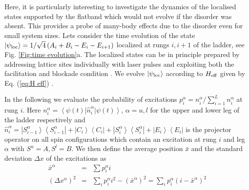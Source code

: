 \documentclass[prl,aps,twocolumn,showpacs,superscriptaddress,longbibliography]{revtex4-1}
\newcommand{\lan}{\left\langle}
\newcommand{\ran}{\right\rangle}
\newcommand{\ket}[1]{\left| #1 \ran}
\newcommand{\bra}[1]{\lan #1 \right|}
\begin{document}
Here, it is particularly interesting to investigate the dynamics of the localised states supported by the flatband which would not evolve if the disorder was absent. This provides a probe of many-body effects due to the disorder even for small system sizes. Lets consider the time evolution of the state $\ket{\psi_{\rm loc}} = 1/\sqrt{4} \left( A_i + B_i - E_i - E_{i+1} \right)$ localized at rungs $i,i+1$ of the ladder, see Fig. \ref{Fig:time evolution}a. The localized states can be in principle prepared by addressing lattice sites individually with laser pulses and exploiting both the facilitation and blockade condition \cite{SM}. We evolve $\ket{\psi_{\rm loc}}$ according to $H_{\rm eff}$ given by Eq. (\ref{eq:H eff}) \cite{SM}.


In the following we evaluate the probability of excitations $p^\alpha_i = n^\alpha_i/\sum_{i=1}^{L} n^\alpha_i$ at rung $i$. Here $n^\alpha_i = \bra{\psi(t)} \hat{n}^\alpha_i \ket{\psi(t)}$, $\alpha=u,l$ for the upper and lower leg of the ladder respectively and $\hat{n}^\alpha_i = \ket{S^\alpha_{i-1}}\bra{S^\alpha_{i-1}} + \ket{C_{i}}\bra{C_{i}} + \ket{S^\alpha_{i}}\bra{S^\alpha_{i}} + \ket{E_{i}}\bra{E_{i}}$ is the projector operator on all spin configurations which contain an excitation at rung $i$ and leg $\alpha$ with $S^u=A, S^l=B$.
We then define the average position $\bar{x}$ and the standard deviation $\Delta x$ of the excitations as
\begin{eqnarray}
	\bar{x}^\alpha &=& \sum p^\alpha_i i \\
	\left( \Delta x^\alpha \right)^2 &=& \sum_i p^\alpha_i i^2 - \left(\bar{x}^\alpha \right)^2 = \sum_i p^\alpha_i (i-\bar{x}^\alpha)^2
	\label{eq:Delta xx}
\end{eqnarray}
\end{document}

